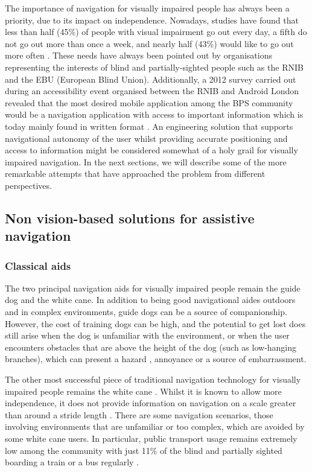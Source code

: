 The importance of navigation for visually impaired people has always been a priority, due to its impact on independence. Nowadays, studies have found that less than half (45\%) of people with visual impairment go out every day, a fifth do not go out more than once a week, and nearly half (43\%) would like to go out more often \citep{douglas2006network}.  These needs have always been pointed out by organisations representing the interests of blind and partially-sighted people such as the RNIB and the EBU (European Blind Union). Additionally, a 2012 survey carried out during an accessibility event organised between the RNIB and Android London revealed that the most desired mobile application among the BPS community would be a navigation application with access to important information which is today mainly found in written format \citep{RNIB2012}. An engineering solution that supports navigational autonomy of the user whilst providing accurate positioning and access to information might be considered somewhat of a holy grail for visually impaired navigation. In the next sections, we will describe some of the more remarkable attempts that have approached the problem from different perspectives.




\subsection{Non vision-based solutions for assistive navigation}

\subsubsection{Classical aids}

The two principal navigation aids for visually impaired people remain the guide dog and the white cane.  In addition to being good navigational aides outdoors and in complex environments, guide dogs can be a source of companionship. However, the cost of training dogs can be high, and the potential to get lost does still arise when the dog is unfamiliar with the environment, or when the user encounters obstacles that are above the height of the dog (such as low-hanging branches), which can present a hazard \citep{manduchi2011mobility}, annoyance or a source of embarrassment. 

The other most successful piece of traditional navigation technology for visually impaired people remains the white cane \citep{roentgen2008inventory}.  Whilst it is known to allow more independence, it does not provide information on navigation on a scale greater than around a stride length \citep{maidenbaum2013increasing}. There are some navigation scenarios, those involving environments that are unfamiliar or too complex, which are avoided by some white cane users. In particular, public transport usage remains extremely low among the community with just 11\% of the blind and partially sighted boarding a train or a bus regularly \citep{Pey2006}.

